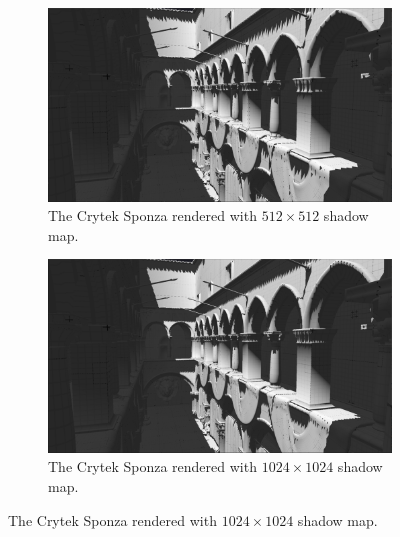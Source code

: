 \begin{figure}[t]
    \centering
    \begin{subfigure}{0.48\textwidth}
		\centering
        \includegraphics[width=\textwidth]{./graf/tests/basic/cropped/sponza_basic_fhd_512.png}
        \caption{The Crytek Sponza rendered with \(512\times 512\) shadow map.}
    \end{subfigure}
	\hfill
    \begin{subfigure}{0.48\textwidth}
		\centering
        \includegraphics[width=\textwidth]{./graf/tests/basic/cropped/sponza_basic_fhd_1024.png}
        \caption{The Crytek Sponza rendered with \(1024\times 1024\) shadow map.}
    \end{subfigure}


\end{figure}
